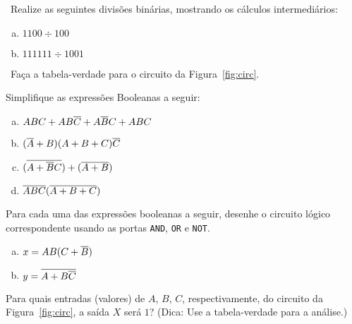 

~Realize as seguintes divisões binárias, mostrando os
cálculos intermediários:

\begin{enumerate}[(a)]
\item $1100\div100$
\item $111111\div1001$
\end{enumerate}

~Faça a tabela-verdade para o circuito da
Figura~\ref{fig:circ}.

 Simplifique as expressões Booleanas a seguir:

\begin{enumerate}[(a)]
\item $ABC+AB\overline{C}+A\overline{B}C+ABC$



\item $(\overline{A}+B)(A+B+C)\overline{C}$




\item $(\overline{A+\overline{B}C})+(\overline{A+B})$

\item $\overline{ABC}(\overline{A+B+C})$

\end{enumerate}

\newpage


 Para cada uma das expressões booleanas a seguir,
desenhe o circuito lógico correspondente usando as portas
{\tt AND}, {\tt OR} e {\tt NOT}.

\begin{enumerate}[(a)]
\item $x=AB(C+\overline{B})$
\item $y=\overline{A+B\overline{C}}$
\end{enumerate}


 Para quais entradas (valores) de $A$, $B$, $C$,
respectivamente, do circuito da Figura~\ref{fig:circ}, a saída $X$
será $1$? (Dica: Use a tabela-verdade para a análise.)

